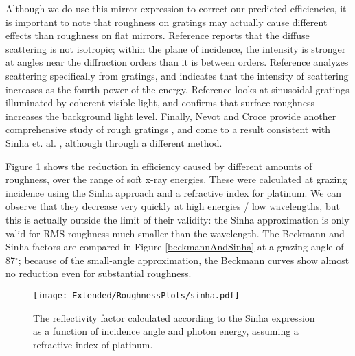 Although we do use this mirror expression to correct our predicted efficiencies, it is important to note that roughness on gratings may actually cause different effects than roughness on flat mirrors.  Reference \cite[Section 10.1.1]{Pal05} reports that the diffuse scattering is not isotropic; within the plane of incidence, the intensity is stronger at angles near the diffraction orders than it is between orders.  Reference \cite{Sha78} analyzes scattering specifically from gratings, and indicates that the intensity of scattering increases as the fourth power of the energy.  Reference \cite{Mar00} looks at sinusoidal gratings illuminated by coherent visible light, and confirms that surface roughness increases the background light level. Finally, Nevot and Croce provide another comprehensive study of rough gratings \cite{Nev80}, and come to a result consistent with Sinha et. al. , although through a different method.

Figure \ref{sinhaReflectivity} shows the reduction in efficiency caused by different amounts of roughness, over the range of soft x-ray energies.  These were calculated at grazing incidence using the Sinha approach and a refractive index for platinum.  We can observe that they decrease very quickly at high energies / low wavelengths, but this is actually outside the limit of their validity: the Sinha approximation is only valid for RMS roughness much smaller than the wavelength.  The Beckmann  and Sinha  factors are compared in Figure \ref{beckmannAndSinha} at a grazing angle of 87$^\circ$; because of the small-angle approximation, the Beckmann curves show almost no reduction even for substantial roughness.

\begin{figure}[htbp] %
   \centering
   \texttt{[image: Extended/RoughnessPlots/sinha.pdf]} 
   \caption{The reflectivity factor calculated according to the Sinha expression \protect {} as a function of incidence angle and photon energy, assuming a refractive index of platinum.}
   \label{sinhaReflectivity}
\end{figure}

